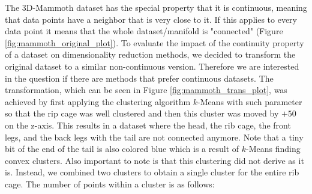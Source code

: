 The 3D-Mammoth dataset has the special property that it is continuous, meaning that data points have a neighbor that is very close to it. If this applies to every data point it means that the whole dataset/manifold is "connected" (Figure \ref{fig:mammoth_original_plot}). To evaluate the impact of the continuity property of a dataset on dimensionality reduction methods, we decided to transform the original dataset to a similar non-continuous version. Therefore we are interested in the question if there are methods that prefer continuous datasets.
The transformation, which can be seen in Figure \ref{fig:mammoth_trans_plot}, was achieved by first applying the clustering algorithm $k$-Means with such parameter so that the rip cage was 
well clustered and then this cluster was moved by $+50$ on the z-axis. This results in a dataset where the head, the rib cage, the front legs, and the back legs with the tail are not connected anymore. Note that a tiny bit of the end of the tail is also colored blue which is a result of $k$-Means finding convex clusters. Also important to note is that this clustering did not derive as it is. Instead, we combined two clusters to obtain a single cluster for the entire rib cage.
The number of points within a cluster is as follows:

